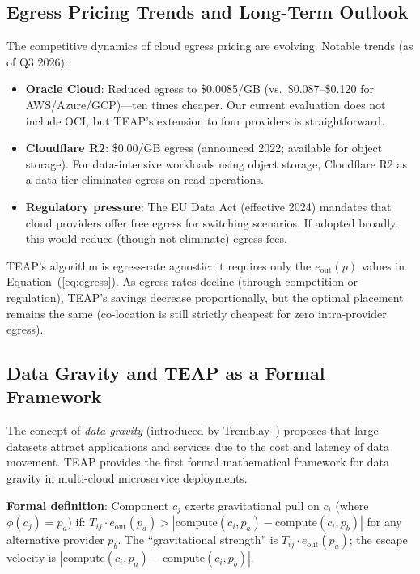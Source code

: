\documentclass[10pt,journal]{IEEEtran}
\begin{document}
\subsection{Egress Pricing Trends and Long-Term Outlook}

The competitive dynamics of cloud egress pricing are evolving.
Notable trends (as of Q3 2026):
\begin{itemize}[leftmargin=*,noitemsep]
  \item \textbf{Oracle Cloud}: Reduced egress to \$0.0085/GB (vs.\ \$0.087--\$0.120
    for AWS/Azure/GCP)---ten times cheaper. Our current evaluation does not include
    OCI, but TEAP's extension to four providers is straightforward.
  \item \textbf{Cloudflare R2}: \$0.00/GB egress (announced 2022; available for
    object storage). For data-intensive workloads using object storage, Cloudflare
    R2 as a data tier eliminates egress on read operations.
  \item \textbf{Regulatory pressure}: The EU Data Act (effective 2024) mandates
    that cloud providers offer free egress for switching scenarios.
    If adopted broadly, this would reduce (though not eliminate) egress fees.
\end{itemize}

TEAP's algorithm is egress-rate agnostic: it requires only the $e_{\text{out}}(p)$
values in Equation~(\ref{eq:egress}).
As egress rates decline (through competition or regulation), TEAP's savings
decrease proportionally, but the optimal placement remains the same (co-location
is still strictly cheapest for zero intra-provider egress).

\subsection{Data Gravity and TEAP as a Formal Framework}

The concept of \emph{data gravity} (introduced by Tremblay~\cite{tremblay2011})
proposes that large datasets attract applications and services due to the cost
and latency of data movement.
TEAP provides the first formal mathematical framework for data gravity in
multi-cloud microservice deployments.

\textbf{Formal definition}: Component $c_j$ exerts gravitational pull on $c_i$
(where $\phi(c_j) = p_a$) if:
$T_{ij} \cdot e_{\text{out}}(p_a) > |\text{compute}(c_i, p_a) - \text{compute}(c_i, p_b)|$
for any alternative provider $p_b$.
The ``gravitational strength'' is $T_{ij} \cdot e_{\text{out}}(p_a)$;
the escape velocity is $|\text{compute}(c_i,p_a) - \text{compute}(c_i,p_b)|$.
\end{document}
